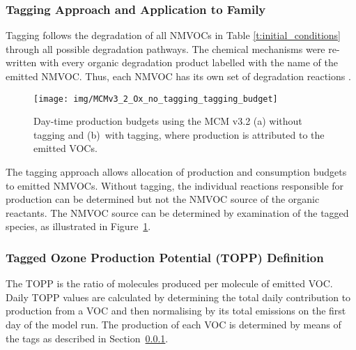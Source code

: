 \subsubsection[Tagging Approach and Application to Ox Family]{Tagging Approach and Application to  Family} \label{ss:tagging} %

Tagging follows the degradation of all NMVOCs in Table \ref{t:initial_conditions} through all possible degradation pathways. 
The chemical mechanisms were re-written with every organic degradation product labelled with the name of the emitted NMVOC. 
Thus, each NMVOC has its own set of degradation reactions \citep{Butler:2011}. 

\begin{figure}
    \centering
    \texttt{[image: img/MCMv3\_2\_Ox\_no\_tagging\_tagging\_budget]}
    \vspace{0mm}
    \caption{Day-time  production budgets using the MCM v3.2 (a) without tagging and \mbox{(b) with} tagging, where  production is attributed to the emitted VOCs.}
    \vspace{-4mm}
    \label{f:Ox_budget}
\end{figure} 

The tagging approach allows allocation of production and consumption budgets to emitted NMVOCs. 
Without tagging, the individual reactions responsible for  production can be determined but not the NMVOC source of the organic reactants. 
The NMVOC source can be determined by examination of the tagged species, as illustrated in \mbox{Figure \ref{f:Ox_budget}}.

\subsubsection{Tagged Ozone Production Potential (TOPP) Definition} %

The TOPP is the ratio of  molecules produced per molecule of emitted VOC.  
Daily TOPP values are calculated by determining the total daily contribution to  production from a VOC and then normalising by its total emissions on the first day of the model run. 
The  production of each VOC is determined by means of the tags as described in \mbox{Section \ref{ss:tagging}}. 
